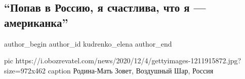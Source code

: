  
 
 
 
 
 
\subsection{\enquote{Попав в Россию, я счастлива, что я --- американка}}
\label{sec:04_12_2020.news.ua.obozrevatel.kudrenko_elena.1.rossia_mat}
\ifcmt
	author_begin
   author_id kudrenko_elena
	author_end
\fi

\ifcmt
pic https://i.obozrevatel.com/news/2020/12/4/gettyimages-1211915872.jpg?size=972x462
caption Родина-Мать Зовет, Воздушный Шар, Россия
\fi

